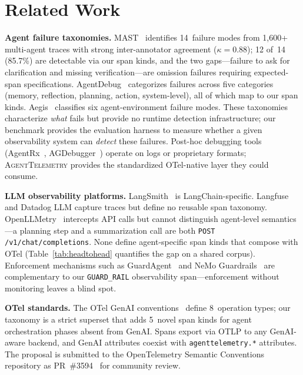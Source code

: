 \documentclass[sigconf,screen]{acmart}
\begin{document}
\section{Related Work}
\label{sec:related}

\textbf{Agent failure taxonomies.}
MAST~\cite{mast} identifies 14~failure modes from 1{,}600+ multi-agent
traces with strong inter-annotator agreement ($\kappa = 0.88$); 12
of~14 (85.7\%) are detectable via our span kinds, and the two
gaps---failure to ask for clarification and missing verification---are
omission failures requiring expected-span specifications.
AgentDebug~\cite{agentdebug} categorizes failures across five
categories (memory, reflection, planning, action, system-level), all of
which map to
our span kinds.  Aegis~\cite{aegis} classifies six agent-environment
failure modes.  These taxonomies characterize \emph{what} fails but
provide no runtime detection infrastructure; our benchmark provides the
evaluation harness to measure whether a given observability system can
\emph{detect} these failures.  Post-hoc debugging tools
(AgentRx~\cite{agentrx}, AGDebugger~\cite{agdebugger}) operate on logs
or proprietary formats; \textsc{AgentTelemetry} provides the
standardized OTel-native layer they could consume.

\textbf{LLM observability platforms.}
LangSmith~\cite{langsmith} is LangChain-specific.
Langfuse~\cite{langfuse} and Datadog LLM capture
traces but define no reusable span taxonomy.
OpenLLMetry~\cite{openllmetry} intercepts API calls but cannot
distinguish agent-level semantics---a planning step and a summarization
call are both \texttt{POST /v1/chat/completions}.
None define agent-specific span kinds that compose with OTel
(Table~\ref{tab:headtohead} quantifies the gap on a shared corpus).
Enforcement mechanisms such as GuardAgent~\cite{guardagent} and
NeMo Guardrails~\cite{nemo_guardrails} are complementary to our
\texttt{GUARD\_RAIL} observability span---enforcement without
monitoring leaves a blind spot.

\textbf{OTel standards.}
The OTel GenAI conventions~\cite{otel} define 8~operation types; our
taxonomy is a strict superset that adds 5~novel span kinds for agent
orchestration phases absent from GenAI.  Spans export via OTLP to any
GenAI-aware backend, and GenAI attributes coexist with
\texttt{agenttelemetry.*} attributes.  The proposal is submitted to
the OpenTelemetry Semantic Conventions repository as
PR~\#3594~\cite{otep_3594} for community review.
\end{document}

